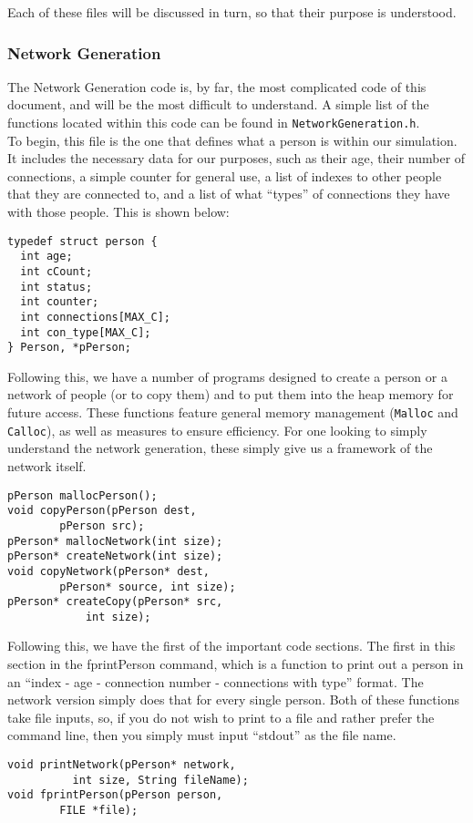 \documentclass{article}
\numberwithin{equation}{section} %
\theoremstyle{definition}
\begin{document}
\begin{multicols*}{2}
Each of these files will be discussed in turn, so that their purpose is understood.

\subsubsection{Network Generation}
The Network Generation code is, by far, the most complicated code of this document, and will be the most difficult to understand. A simple list of the functions located within this code can be found in \lstinline{NetworkGeneration.h}. \\

To begin, this file is the one that defines what a person is within our simulation. It includes the necessary data for our purposes, such as their age, their number of connections, a simple counter for general use, a list of indexes to other people that they are connected to, and a list of what ``types'' of connections they have with those people. This is shown below:
\begin{lstlisting}
typedef struct person {
  int age;
  int cCount;
  int status;
  int counter;
  int connections[MAX_C];
  int con_type[MAX_C];
} Person, *pPerson;
\end{lstlisting}

Following this, we have a number of programs designed to create a person or a network of people (or to copy them) and to put them into the heap memory for future access. These functions feature general memory management (\lstinline{Malloc} and \lstinline{Calloc}), as well as measures to ensure efficiency. For one looking to simply understand the network generation, these simply give us a framework of the network itself.
\begin{lstlisting}
pPerson mallocPerson();
void copyPerson(pPerson dest,
        pPerson src);
pPerson* mallocNetwork(int size);
pPerson* createNetwork(int size);
void copyNetwork(pPerson* dest,
        pPerson* source, int size);
pPerson* createCopy(pPerson* src,
            int size);
\end{lstlisting}

Following this, we have the first of the important code sections. The first in this section in the fprintPerson command, which is a function to print out a person in an ``index - age - connection number - connections with type'' format. The network version simply does that for every single person. Both of these functions take file inputs, so, if you do not wish to print to a file and rather prefer the command line, then you simply must input ``stdout'' as the file name.
\begin{lstlisting}
void printNetwork(pPerson* network,
          int size, String fileName);
void fprintPerson(pPerson person,
        FILE *file);
\end{lstlisting}


\end{multicols*}
\end{document}
